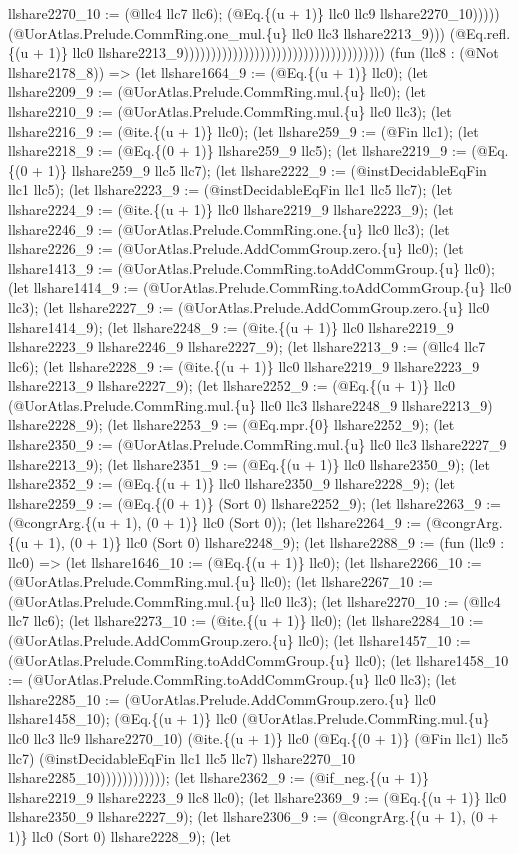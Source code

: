 \documentclass[11pt]{article}
\begin{document}
llshare2270\_10 := (@llc4 llc7 llc6); (@Eq.\{(u + 1)\} llc0 llc9 llshare2270\_10))))) (@UorAtlas.Prelude.CommRing.one\_mul.\{u\} llc0 llc3 llshare2213\_9))) (@Eq.refl.\{(u + 1)\} llc0 llshare2213\_9))))))))))))))))))))))))))))))))))))) (fun (llc8 : (@Not llshare2178\_8)) => (let llshare1664\_9 := (@Eq.\{(u + 1)\} llc0); (let llshare2209\_9 := (@UorAtlas.Prelude.CommRing.mul.\{u\} llc0); (let llshare2210\_9 := (@UorAtlas.Prelude.CommRing.mul.\{u\} llc0 llc3); (let llshare2216\_9 := (@ite.\{(u + 1)\} llc0); (let llshare259\_9 := (@Fin llc1); (let llshare2218\_9 := (@Eq.\{(0 + 1)\} llshare259\_9 llc5); (let llshare2219\_9 := (@Eq.\{(0 + 1)\} llshare259\_9 llc5 llc7); (let llshare2222\_9 := (@instDecidableEqFin llc1 llc5); (let llshare2223\_9 := (@instDecidableEqFin llc1 llc5 llc7); (let llshare2224\_9 := (@ite.\{(u + 1)\} llc0 llshare2219\_9 llshare2223\_9); (let llshare2246\_9 := (@UorAtlas.Prelude.CommRing.one.\{u\} llc0 llc3); (let llshare2226\_9 := (@UorAtlas.Prelude.AddCommGroup.zero.\{u\} llc0); (let llshare1413\_9 := (@UorAtlas.Prelude.CommRing.toAddCommGroup.\{u\} llc0); (let llshare1414\_9 := (@UorAtlas.Prelude.CommRing.toAddCommGroup.\{u\} llc0 llc3); (let llshare2227\_9 := (@UorAtlas.Prelude.AddCommGroup.zero.\{u\} llc0 llshare1414\_9); (let llshare2248\_9 := (@ite.\{(u + 1)\} llc0 llshare2219\_9 llshare2223\_9 llshare2246\_9 llshare2227\_9); (let llshare2213\_9 := (@llc4 llc7 llc6); (let llshare2228\_9 := (@ite.\{(u + 1)\} llc0 llshare2219\_9 llshare2223\_9 llshare2213\_9 llshare2227\_9); (let llshare2252\_9 := (@Eq.\{(u + 1)\} llc0 (@UorAtlas.Prelude.CommRing.mul.\{u\} llc0 llc3 llshare2248\_9 llshare2213\_9) llshare2228\_9); (let llshare2253\_9 := (@Eq.mpr.\{0\} llshare2252\_9); (let llshare2350\_9 := (@UorAtlas.Prelude.CommRing.mul.\{u\} llc0 llc3 llshare2227\_9 llshare2213\_9); (let llshare2351\_9 := (@Eq.\{(u + 1)\} llc0 llshare2350\_9); (let llshare2352\_9 := (@Eq.\{(u + 1)\} llc0 llshare2350\_9 llshare2228\_9); (let llshare2259\_9 := (@Eq.\{(0 + 1)\} (Sort 0) llshare2252\_9); (let llshare2263\_9 := (@congrArg.\{(u + 1), (0 + 1)\} llc0 (Sort 0)); (let llshare2264\_9 := (@congrArg.\{(u + 1), (0 + 1)\} llc0 (Sort 0) llshare2248\_9); (let llshare2288\_9 := (fun (llc9 : llc0) => (let llshare1646\_10 := (@Eq.\{(u + 1)\} llc0); (let llshare2266\_10 := (@UorAtlas.Prelude.CommRing.mul.\{u\} llc0); (let llshare2267\_10 := (@UorAtlas.Prelude.CommRing.mul.\{u\} llc0 llc3); (let llshare2270\_10 := (@llc4 llc7 llc6); (let llshare2273\_10 := (@ite.\{(u + 1)\} llc0); (let llshare2284\_10 := (@UorAtlas.Prelude.AddCommGroup.zero.\{u\} llc0); (let llshare1457\_10 := (@UorAtlas.Prelude.CommRing.toAddCommGroup.\{u\} llc0); (let llshare1458\_10 := (@UorAtlas.Prelude.CommRing.toAddCommGroup.\{u\} llc0 llc3); (let llshare2285\_10 := (@UorAtlas.Prelude.AddCommGroup.zero.\{u\} llc0 llshare1458\_10); (@Eq.\{(u + 1)\} llc0 (@UorAtlas.Prelude.CommRing.mul.\{u\} llc0 llc3 llc9 llshare2270\_10) (@ite.\{(u + 1)\} llc0 (@Eq.\{(0 + 1)\} (@Fin llc1) llc5 llc7) (@instDecidableEqFin llc1 llc5 llc7) llshare2270\_10 llshare2285\_10)))))))))))); (let llshare2362\_9 := (@if\_neg.\{(u + 1)\} llshare2219\_9 llshare2223\_9 llc8 llc0); (let llshare2369\_9 := (@Eq.\{(u + 1)\} llc0 llshare2350\_9 llshare2227\_9); (let llshare2306\_9 := (@congrArg.\{(u + 1), (0 + 1)\} llc0 (Sort 0) llshare2228\_9); (let 
\end{document}
